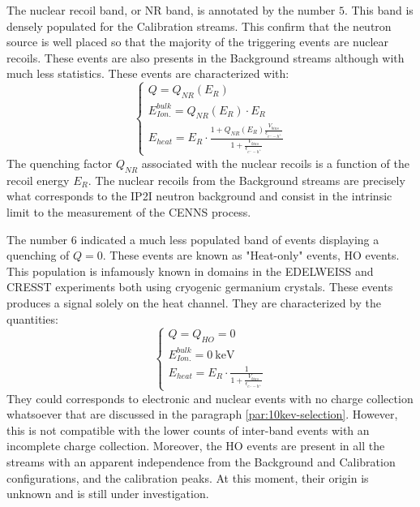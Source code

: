 The nuclear recoil band, or NR band, is annotated by the number $5$. This band is densely populated for the Calibration streams. This confirm that the neutron source is well placed so that the majority of the triggering events are nuclear recoils. These events are also presents in the Background streams although with much less statistics. These events are characterized with:
\begin{equation}
\label{eq:nr-band}
\begin{cases}
Q = Q_{NR} \left( E_R \right) \\
E_{Ion.}^{bulk} = Q_{NR}\left( E_R \right) \cdot E_R \\
E_{heat} 
=
E_R 
\cdot
\frac{
1 + Q_{NR} \left( E_R \right)\frac{V_{bias}}{\epsilon_{e^--h^+}}
}{
1 + \frac{V_{bias}}{\epsilon_{e^--h^+}}
}
\end{cases}
\end{equation}
The quenching factor $Q_{NR}$ associated with the nuclear recoils is a function of the recoil energy $E_R$.
The nuclear recoils from the Background streams are precisely what corresponds to the IP2I neutron background and consist in the intrinsic limit to the measurement of the CENNS process.

The number $6$ indicated a much less populated band of events displaying a quenching of $Q=0$. These events are known as "Heat-only" events, HO events. This population is infamously known in domains in the EDELWEISS and CRESST experiments both using cryogenic germanium crystals. These events produces a signal solely on the heat channel. They are characterized by the quantities:
\begin{equation}
\label{eq:ho-band}
\begin{cases}
Q = Q_{HO} = 0 \\
E_{Ion.}^{bulk} = \SI{0}{\kilo\eV}\\
E_{heat} 
=
E_R 
\cdot
\frac{
1
}{
1 + \frac{V_{bias}}{\epsilon_{e^--h^+}}
}
\end{cases}
\end{equation}
They could corresponds to electronic and nuclear events with no charge collection whatsoever that are discussed in the paragraph \ref{par:10kev-selection}. However, this is not compatible with the lower counts of inter-band events with an incomplete charge collection. Moreover, the HO events are present in all the streams with an apparent independence from the Background and Calibration configurations, and the calibration peaks.
At this moment, their origin is unknown and is still under investigation.

